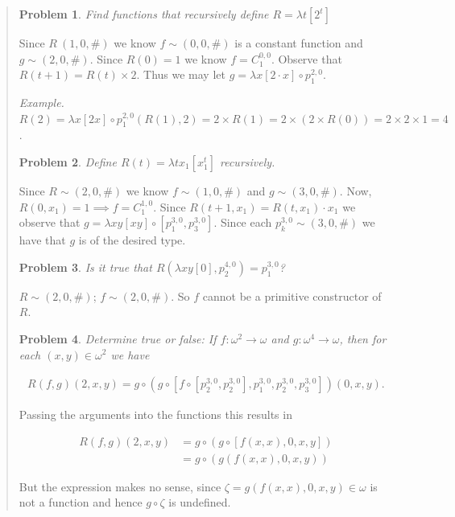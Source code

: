 \documentclass[a4paper, 12pt]{article}
\newtheorem{problem}{Problem}
\newtheorem{problem}{Problem}
\begin{document}
\small
\begin{quote}

\begin{problem}
    Find functions that recursively define $R = \lambda t \left[ 2^t \right] $
\end{problem}

Since $R ~ (1, 0, \#)$ we know $f \sim (0, 0, \#)$ is a constant function and $g
\sim (2, 0, \#)$. Since $R(0) = 1$ we know $f = C_{1}^{0, 0}$. Observe that $R(t
+ 1) = R(t) \times 2$. Thus we may let $g = \lambda x [2 \cdot x] \circ
p_{1}^{2, 0}$. 

\textit{Example.} $R(2) = \lambda x[2x] \circ p_1^{2, 0} \left( R(1), 2 \right)
= 2 \times R(1) = 2 \times \left( 2 \times R(0) \right) = 2 \times 2 \times 1 =
4$.

\begin{problem}
    Define $R(t) = \lambda tx_1\left[ x_1^t \right] $ recursively.
\end{problem}

Since $R \sim (2, 0, \#)$ we know $f \sim (1, 0, \#)$ and $g \sim (3, 0, \#)$.
Now, $R(0, x_1) = 1 \implies f = C_{1}^{1, 0}$. Since $R(t + 1, x_1) = R(t, x_1)
\cdot x_1$  we observe that $g = \lambda xy[xy] \circ \left[ p_1^{3, 0},
p_{3}^{3, 0} \right] $. Since each $p_{k}^{3, 0} \sim (3, 0, \#)$ we have that
$g$ is of the desired type.

\begin{problem}
    Is it true that $R(\lambda xy[0], p_2^{4, 0}) = p_1^{3, 0}$?
\end{problem}

$R \sim (2, 0, \#)$; $f \sim (2, 0, \#)$. So $f$ cannot be a primitive
constructor of $R$.

\begin{problem}
    Determine true or false: If $f : \omega^2 \to \omega$ and $g : \omega^4 \to
    \omega$, then for each $(x, y) \in \omega^2$ we have

    \begin{align*}
        R(f, g)(2, x, y) = g \circ \left( g \circ \left[ f \circ \left[ p_2^{3,
        0}, p_2^{3, 0} \right], p_1^{3, 0}, p_2^{3, 0}, p_3^{3, 0}  \right]
    \right) (0, x, y).
    \end{align*}
\end{problem}

Passing the arguments into the functions this results in 

\begin{align*}
    R(f, g)(2, x, y) &= g \circ \left( g \circ \left[ f(x, x) , 0, x, y
    \right]\right)  \\ 
                     &= g \circ \left( g \left( f(x, x), 0, x, y \right)
                     \right)
\end{align*}

But the expression makes no sense, since $\zeta = g(f(x, x), 0, x, y) \in
\omega$ is not a function and hence $g \circ \zeta$ is undefined.

\end{quote}
\normalsize
\end{document}
